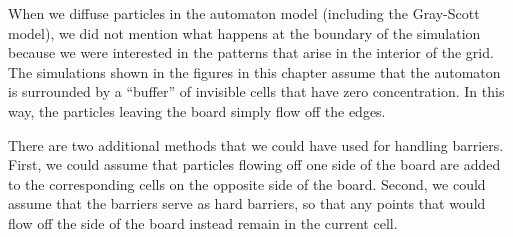 \begin{exercise}[%
Try changing the diffusion rates in the Gray-Scott model from the values of $\textvar{dA} = 0.2$ and $\textvar{dB} = 0.1$ presented in this chapter to see if the same behavior is obtained. What happens if we multiply both diffusion rates by a constant factor? What happens if we make the diffusion rates equal?
]\end{exercise}

When we diffuse particles in the automaton model (including the Gray-Scott model), we did not mention what happens at the boundary of the simulation because we were interested in the patterns that arise in the interior of the grid. The simulations shown in the figures in this chapter assume that the automaton is surrounded by a ``buffer'' of invisible cells that have zero concentration. In this way, the particles leaving the board simply flow off the edges.

There are two additional methods that we could have used for handling barriers. First, we could assume that particles flowing off one side of the board are added to the corresponding cells on the opposite side of the board. Second, we could assume that the barriers serve as hard barriers, so that any points that would flow off the side of the board instead remain in the current cell.\\

\begin{exercise}\end{exercise}
